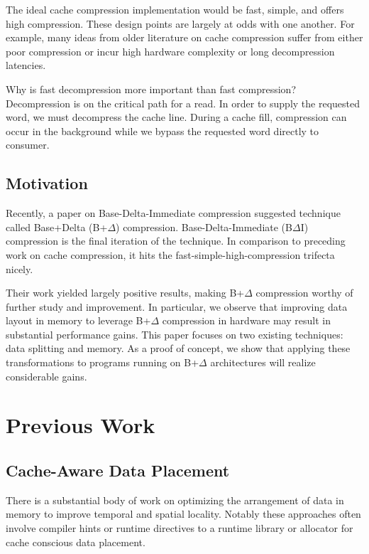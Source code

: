 \documentclass[pageno]{jpaper}
\begin{document}
The ideal cache compression implementation would be fast, simple, and offers high compression. These design points are largely at odds with one another. For example, many ideas from older literature on cache compression suffer from either poor compression or incur high hardware complexity or long decompression latencies.

Why is fast decompression more important than fast compression? Decompression is on the critical path for a read. In order to supply the requested word, we must decompress the cache line. During a cache fill, compression can occur in the background while we bypass the requested word directly to consumer.

\subsection{Motivation}

Recently, a paper on Base-Delta-Immediate compression \cite{baseDeltaImm} suggested technique called Base+Delta (B+$\Delta$) compression. Base-Delta-Immediate (B$\Delta$I) compression is the final iteration of the technique. In comparison to preceding work on cache compression, it hits the fast-simple-high-compression trifecta nicely.

Their work yielded largely positive results, making B+$\Delta$ compression worthy of further study and improvement. In particular, we observe that improving data layout in memory to leverage B+$\Delta$ compression in hardware may result in substantial performance gains. This paper focuses on two existing techniques: data splitting and memory. As a proof of concept, we show that applying these transformations to programs running on B+$\Delta$ architectures will realize considerable gains.


\section{Previous Work}

\subsection{Cache-Aware Data Placement}

There is a substantial body of work on optimizing the arrangement of data in memory to improve temporal and spatial locality. Notably these approaches often involve compiler hints or runtime directives to a runtime library \cite{structLayoutHints} or allocator \cite{structLayoutAllocHints} for cache conscious data placement.
\end{document}
